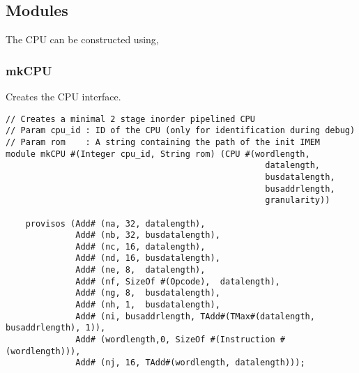 \begin{paper}
\section*{Modules\sdot}
The CPU can be constructed using,
\subsubsection*{mkCPU\sdot}
Creates the CPU interface.
\begin{verbatim}
// Creates a minimal 2 stage inorder pipelined CPU
// Param cpu_id : ID of the CPU (only for identification during debug)
// Param rom    : A string containing the path of the init IMEM
module mkCPU #(Integer cpu_id, String rom) (CPU #(wordlength, 
                                                    datalength, 
                                                    busdatalength, 
                                                    busaddrlength, 
                                                    granularity))

    provisos (Add# (na, 32, datalength), 
              Add# (nb, 32, busdatalength), 
              Add# (nc, 16, datalength),
              Add# (nd, 16, busdatalength),
              Add# (ne, 8,  datalength),
              Add# (nf, SizeOf #(Opcode),  datalength),
              Add# (ng, 8,  busdatalength),
              Add# (nh, 1,  busdatalength),
              Add# (ni, busaddrlength, TAdd#(TMax#(datalength, busaddrlength), 1)),
              Add# (wordlength,0, SizeOf #(Instruction #(wordlength))),
              Add# (nj, 16, TAdd#(wordlength, datalength)));
\end{verbatim}
\end{paper}


